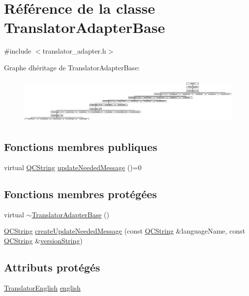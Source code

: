 \hypertarget{class_translator_adapter_base}{}\section{Référence de la classe Translator\+Adapter\+Base}
\label{class_translator_adapter_base}


{\ttfamily \#include $<$translator\+\_\+adapter.\+h$>$}

Graphe d\textquotesingle{}héritage de Translator\+Adapter\+Base\+:\begin{figure}[H]
\begin{center}
\leavevmode
\includegraphics[height=2.347561cm]{class_translator_adapter_base}
\end{center}
\end{figure}
\subsection*{Fonctions membres publiques}
\begin{DoxyCompactItemize}
\item 
virtual \hyperlink{class_q_c_string}{Q\+C\+String} \hyperlink{class_translator_adapter_base_acc5b89c39bae2a9bca490016ec15c79f}{update\+Needed\+Message} ()=0
\end{DoxyCompactItemize}
\subsection*{Fonctions membres protégées}
\begin{DoxyCompactItemize}
\item 
virtual \hyperlink{class_translator_adapter_base_a1be363973c6841e1d917b32529a03ae0}{$\sim$\+Translator\+Adapter\+Base} ()
\item 
\hyperlink{class_q_c_string}{Q\+C\+String} \hyperlink{class_translator_adapter_base_a71493b87a34d6e4c232e540734aba698}{create\+Update\+Needed\+Message} (const \hyperlink{class_q_c_string}{Q\+C\+String} \&language\+Name, const \hyperlink{class_q_c_string}{Q\+C\+String} \&\hyperlink{src_2version_8h_a36cd4423c6c7f435d232a1ad0f9ad4d7}{version\+String})
\end{DoxyCompactItemize}
\subsection*{Attributs protégés}
\begin{DoxyCompactItemize}
\item 
\hyperlink{class_translator_english}{Translator\+English} \hyperlink{class_translator_adapter_base_a75fd1d1116debf9adacfef772a04a7b1}{english}
\end{DoxyCompactItemize}



